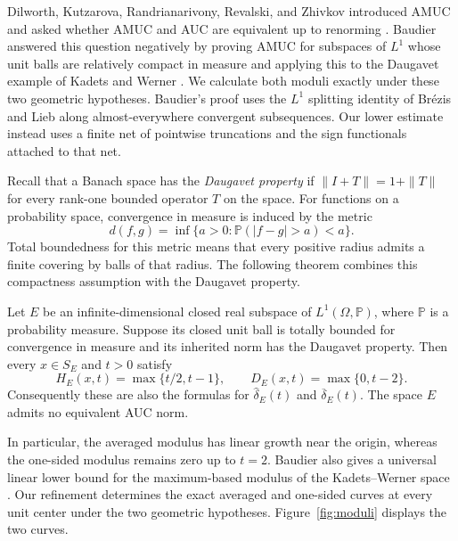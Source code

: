 Dilworth, Kutzarova, Randrianarivony, Revalski, and Zhivkov introduced
AMUC and asked whether AMUC and AUC are equivalent up to renorming
\cite[Definition~2.2 and the question in Section~5]{DKRRZ2016}.
Baudier answered this question negatively by proving
AMUC for subspaces of $L^1$ whose unit balls are relatively compact in
measure and applying this to the Daugavet example of Kadets and Werner
\cite[Theorem~1 and Corollary~1]{Baudier2026}.  We calculate both moduli
exactly under these two geometric hypotheses.  Baudier's proof uses
the $L^1$ splitting identity of Br\'ezis and Lieb
\cite[Theorem~1]{BrezisLieb1983} along almost-everywhere convergent
subsequences.  Our lower estimate instead uses a finite net of pointwise
truncations and the sign functionals attached to that net.

Recall that a Banach space has the \emph{Daugavet property} if
$\|I+T\|=1+\|T\|$ for every rank-one bounded operator $T$ on the space.
For functions on a probability space, convergence in measure is induced
by the metric
\begin{equation}\label{eq:measure-metric}
 d(f,g)=\inf\{a>0:\mathbb P(|f-g|>a)<a\}.
\end{equation}
Total boundedness for this metric means that every positive radius
admits a finite covering by balls of that radius. The following theorem
combines this compactness assumption with the Daugavet property.

\begin{theorem}\label{thm:exact}
Let $E$ be an infinite-dimensional closed real subspace of
$L^1(\Omega,\mathbb P)$, where $\mathbb P$ is a probability measure.
Suppose its closed unit ball is totally bounded for convergence in
measure and its inherited norm has the Daugavet property.  Then every
$x\in S_E$ and $t>0$ satisfy
\[
 H_E(x,t)=\max\{t/2,t-1\},\qquad
 D_E(x,t)=\max\{0,t-2\}.
\]
Consequently these are also the formulas for
$\widehat\delta_E(t)$ and $\overline\delta_E(t)$.  The space $E$ admits
no equivalent AUC norm.
\end{theorem}

In particular, the averaged modulus has linear growth near the origin,
whereas the one-sided modulus remains zero up to $t=2$.
Baudier also gives a universal linear lower bound for the maximum-based
modulus of the Kadets--Werner space
\cite[final paragraph]{Baudier2026}.  Our refinement determines the exact
averaged and one-sided curves at every unit center under the two
geometric hypotheses.
Figure~\ref{fig:moduli} displays the two curves.


